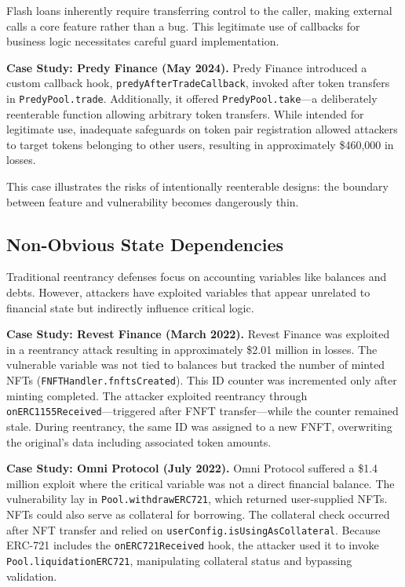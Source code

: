 Flash loans inherently require transferring control to the caller, making external calls a core feature rather than a bug. This legitimate use of callbacks for business logic necessitates careful guard implementation.

\textbf{Case Study: Predy Finance (May 2024).} Predy Finance introduced a custom callback hook, \lstinline{predyAfterTradeCallback}, invoked after token transfers in \lstinline{PredyPool.trade}. Additionally, it offered \lstinline{PredyPool.take}---a deliberately reenterable function allowing arbitrary token transfers. While intended for legitimate use, inadequate safeguards on token pair registration allowed attackers to target tokens belonging to other users, resulting in approximately \$460,000 in losses.

This case illustrates the risks of intentionally reenterable designs: the boundary between feature and vulnerability becomes dangerously thin.

\subsection{Non-Obvious State Dependencies}
\label{sec:results-state}
\label{case-study:4}
\label{case-study:5}

Traditional reentrancy defenses focus on accounting variables like balances and debts. However, attackers have exploited variables that appear unrelated to financial state but indirectly influence critical logic.

\textbf{Case Study: Revest Finance (March 2022).} Revest Finance was exploited in a reentrancy attack resulting in approximately \$2.01 million in losses. The vulnerable variable was not tied to balances but tracked the number of minted NFTs (\lstinline{FNFTHandler.fnftsCreated}). This ID counter was incremented only after minting completed. The attacker exploited reentrancy through \lstinline{onERC1155Received}---triggered after FNFT transfer---while the counter remained stale. During reentrancy, the same ID was assigned to a new FNFT, overwriting the original's data including associated token amounts.

\textbf{Case Study: Omni Protocol (July 2022).} Omni Protocol suffered a \$1.4 million exploit where the critical variable was not a direct financial balance. The vulnerability lay in \lstinline{Pool.withdrawERC721}, which returned user-supplied NFTs. NFTs could also serve as collateral for borrowing. The collateral check occurred after NFT transfer and relied on \lstinline{userConfig.isUsingAsCollateral}. Because ERC-721 includes the \lstinline{onERC721Received} hook, the attacker used it to invoke \lstinline{Pool.liquidationERC721}, manipulating collateral status and bypassing validation.

